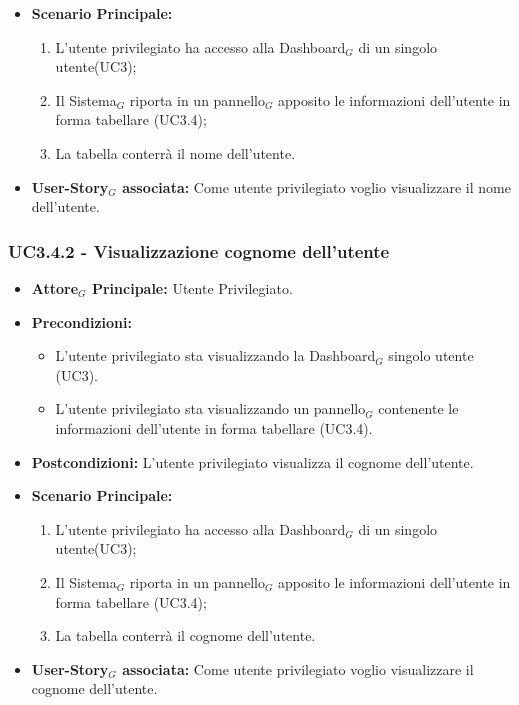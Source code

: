 \documentclass[10pt]{article}
\begin{document}
\begin{justify}
\begin{itemize}
      \item \textbf{Scenario Principale:}
        \begin{enumerate}
            \item L'utente privilegiato ha accesso alla Dashboard$_G$ di un singolo utente(UC3);
            \item Il Sistema$_G$ riporta  in un pannello$_G$ apposito le informazioni dell'utente in forma tabellare (UC3.4);
            \item La tabella conterrà il nome dell'utente.
        \end{enumerate}
     \item \textbf{User-Story$_G$ associata:}
       Come utente privilegiato voglio visualizzare il nome dell'utente.
\end{itemize}

\subsubsection{\textbf{UC3.4.2 - Visualizzazione cognome dell'utente}}
\label{UC3.4.2}
\begin{itemize}
     \item \textbf{Attore$_G$ Principale:} Utente Privilegiato.
     \item \textbf{Precondizioni:}
        \begin{itemize}
    	\item L'utente privilegiato sta visualizzando la Dashboard$_G$ singolo utente (UC3).
          \item L'utente privilegiato sta visualizzando un pannello$_G$ contenente le informazioni dell'utente in forma tabellare (UC3.4).
        \end{itemize}
      \item \textbf{Postcondizioni:} L'utente privilegiato visualizza il cognome dell'utente. 
      \item \textbf{Scenario Principale:}
        \begin{enumerate}
            \item L'utente privilegiato ha accesso alla Dashboard$_G$ di un singolo utente(UC3);
            \item Il Sistema$_G$ riporta  in un pannello$_G$ apposito le informazioni dell'utente in forma tabellare (UC3.4);
            \item La tabella conterrà il cognome dell'utente.
        \end{enumerate}
     \item \textbf{User-Story$_G$ associata:}
       Come utente privilegiato voglio visualizzare il cognome dell'utente.
\end{itemize}


\end{justify}
\end{document}
